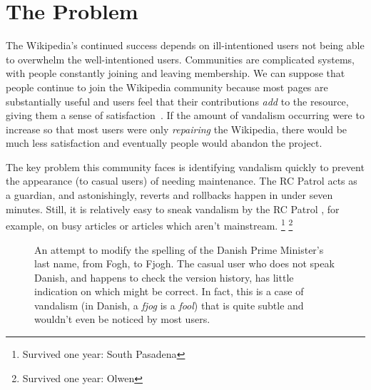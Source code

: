 \section{The Problem}

The Wikipedia's continued success depends on ill-intentioned users
not being able to overwhelm the well-intentioned users.
Communities are complicated systems, with people constantly joining and
leaving membership.
We can suppose that people continue to
join the Wikipedia community because most pages are
substantially useful and users feel that their contributions
\textit{add} to the resource,
giving them a sense of satisfaction~\cite{Benkler2002}.
If the amount of vandalism occurring were to increase so that
most users were only \textit{repairing} the Wikipedia, there
would be much less satisfaction and eventually people would
abandon the project.

The key problem this community faces is identifying vandalism
quickly to prevent the appearance (to casual users)
 of needing maintenance.
The RC Patrol acts as a guardian, and astonishingly, reverts and
rollbacks happen in under seven minutes.
Still, it is relatively easy to sneak vandalism by the
RC Patrol ,
for example, on busy articles or articles which aren't mainstream.
\footnote{Survived one year: South Pasadena}
\footnote{Survived one year: Olwen}



\begin{figure}[t]
\centering
{}
\hspace{1ex}
\caption{An attempt to modify the
  spelling of the Danish Prime Minister's last name, from Fogh, to Fjogh.
  The casual user who does not speak Danish, and happens to check
  the version history, has little indication on which might be correct.
  In fact, this is a case of vandalism
  (in Danish, a \textit{fjog} is a \textit{fool})
  that is quite subtle and wouldn't even be noticed by most users.}
\label{fig-denmark}
\end{figure}


